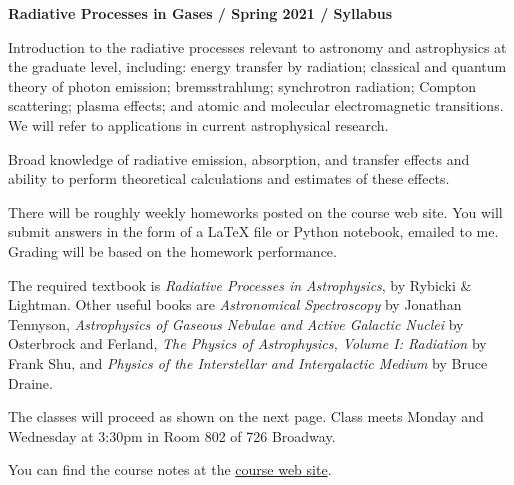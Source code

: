 \documentclass[11pt]{article}
\begin{document}
\begin{center}
  {\bf Radiative Processes in Gases / Spring 2021 / Syllabus }
\end{center}


 Introduction to the radiative
processes relevant to astronomy and astrophysics at the graduate
level, including: energy transfer by radiation; classical and quantum
theory of photon emission; bremsstrahlung; synchrotron radiation;
Compton scattering; plasma effects; and atomic and molecular
electromagnetic transitions.  We will refer to applications in current
astrophysical research.

 Broad knowledge of radiative
emission, absorption, and transfer effects and ability to perform
theoretical calculations and estimates of these effects.

 There will be roughly weekly homeworks
posted on the course web site.  You will submit answers in the form of
a LaTeX file or Python notebook, emailed to me. Grading will be based
on the homework performance.

 The required textbook is {\it Radiative
  Processes in Astrophysics}, by Rybicki \& Lightman. Other useful
books are {\it Astronomical Spectroscopy} by Jonathan Tennyson, {\it
  Astrophysics of Gaseous Nebulae and Active Galactic Nuclei} by
Osterbrock and Ferland, {\it The Physics of Astrophysics, Volume
  I: Radiation} by Frank Shu, and {\it Physics of the Interstellar and
  Intergalactic Medium} by Bruce Draine.

\noindent The classes will proceed as shown on the next page.  Class
meets Monday and Wednesday at 3:30pm in Room 802 of 726 Broadway.

\noindent You can find the course notes at the
\href{http://blanton144.github.io/radiative}{course web site}. 

\end{document}
